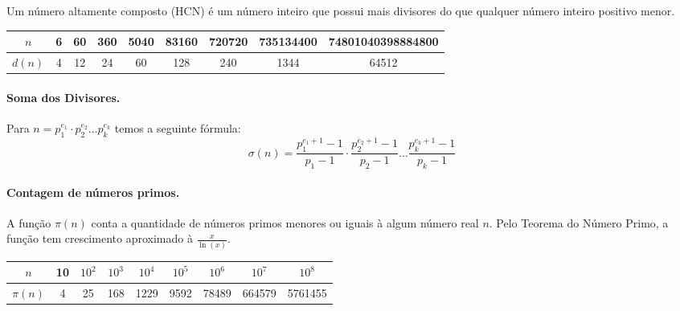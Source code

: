 Um número altamente composto (HCN) é um número inteiro que possui mais divisores do que qualquer número inteiro positivo menor.

\begin{center}
    \begin{tabular}{c|c|c|c|c|c|c|c|c}
        $n$ & 6 & 60&360&5040&83160&720720&735134400&74801040398884800 \\
        \hline
        $d(n)$ & 4&12&24&60&128&240&1344&64512
    \end{tabular}
\end{center}

\paragraph{Soma dos Divisores.} Para $n = p_1^{e_1}\cdot p_2^{e_2}\dots p_k^{e_k}$ temos a seguinte fórmula:
$$\sigma(n) = \frac{p_1^{e_1+1}-1}{p_1-1} \cdot \frac{p_2^{e_2+1}-1}{p_2-1}  \dots  \frac{p_k^{e_k+1}-1}{p_k-1}$$

\paragraph{Contagem de números primos.} A função $\pi(n)$ conta a quantidade de números primos menores ou iguais à algum número real $n$. Pelo Teorema do Número Primo, a função tem crescimento aproximado à $\frac{x}{\ln(x)}$.

\begin{center}
    \begin{tabular}{c|c|c|c|c|c|c|c|c}
        $n$ &10&$10^2$&$10^3$&$10^4$&$10^5$&$10^6$&$10^7$&$10^8$ \\
        \hline
        $\pi(n)$ &4&25&168&1229&9592&78489&664579&5761455
        
    \end{tabular}
\end{center}
